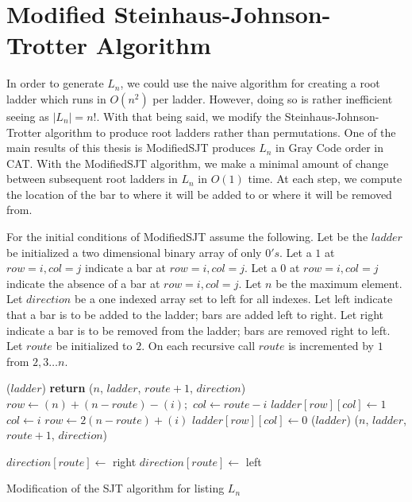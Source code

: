 

\section{Modified Steinhaus-Johnson-Trotter Algorithm}
In order to generate $L_{n}$, we could use the naive algorithm for creating a root ladder which runs in $O(n^{2})$ per ladder. 
However, doing so is rather inefficient seeing as $|L_{n}|=n!$. With that being said, we modify the Steinhaus-Johnson-Trotter algorithm 
to produce root ladders rather than permutations. 
One of the main results of this thesis is {\sc ModifiedSJT} produces $L_{n}$ in Gray Code order in CAT. With the {\sc ModifiedSJT} algorithm, we make a minimal amount of change between subsequent root ladders in $L_{n}$
 in $O(1)$ time. At each step, we compute the location of the bar to where it will be added to or where it will be removed from. 

For the initial conditions of {\sc ModifiedSJT} assume the following. 
Let be the $ladder$ be initialized a two dimensional binary array of only $0's$.
 Let a $1$ at $row=i,col=j$ 
indicate a bar at  $row=i,col=j$. Let a $0$ at $row=i,col=j$ 
indicate the absence of a bar at  $row=i,col=j$.
Let $n$ be the maximum element. Let $direction$ be a one 
indexed array set to left for all indexes. Let left indicate that a bar is to be added to the ladder; bars 
are added left to right. Let right indicate a bar is to be removed from the ladder; bars 
are removed right to left. Let $route$ be initialized to $2$. On each recursive call 
$route$ is incremented by $1$ from $2,3 \dots n$.
\begin{algorithm}
  \begin{algorithmic}[1]
          ($ladder$)
        \EndIf
        \State \textbf{return}
      \EndIf
          ($n$, $ladder$, $route+1$, $direction$)
        \Else 
            \State $row \gets (n) + (n - route) - (i);$
            \State $col \gets route - i$
            \State $ladder[row][col] \gets 1$
          \Else
            \State $col \gets i$
            \State $row \gets 2(n - route) + (i)$
            \State $ladder[row][col] \gets 0$
          \EndIf
          ($ladder$)
          ($n$, $ladder$, $route+1$, $direction$)
        \EndIf
        
      \EndFor
        \State $direction[route] \gets$ right
      \Else
        \State $direction[route] \gets$ left
      \EndIf
    \EndFunction
  \end{algorithmic}
  \caption{Modification of the {\sc SJT} algorithm for listing $L_{n}$}
  \label{Alg:ModSJT}
\end{algorithm}


